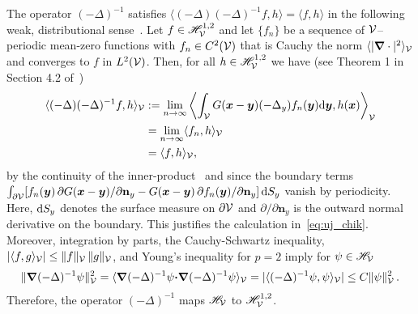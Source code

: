 \documentclass[amsa]{ipart}
\begin{document}
The operator $(-\Delta)^{-1}$ satisfies $\langle(-\Delta)(-\Delta)^{-1}f,h\rangle=\langle f,h\rangle$ in the
following weak, distributional
sense~\cite{McOwen:2003:PDE,Folland:95:PDEs}. Let
$f\in\mathscr{H}^{1,2}_{\mathcal{V}}$ and let $\{ f_n\}$ be a sequence of
$\mathcal{V}$--periodic mean-zero functions with $f_n\in C^2(\mathcal{V})$ that is
Cauchy the norm $\langle|\mbox{\boldmath${\nabla}$}\cdot|^2\rangle_{\mathcal{V}}$ and converges to $f$ in 
$L^2(\mathcal{V})$. Then, for all $h\in\mathscr{H}^{1,2}_{\mathcal{V}}$ we have  (see
Theorem 1 in Section 4.2 of~\cite{McOwen:2003:PDE})      
%
\begin{align}\label{eq:Weak_Delta_1}
  \langle(-\Delta)(-\Delta)^{-1}f,h\rangle_{\Vc}
  &:=\lim_{n\to\infty}
  \left\langle\int_{\Vc} G(\vecx-\vecy)(-\Delta_y)f_n(\vecy)\d\vecy,h(\vecx)\right\rangle_{\Vc}
  \\\notag
  &=\lim_{n\to\infty}\langle f_n,h\rangle_{\Vc}
  \\\notag
  &=\langle f,h\rangle_{\Vc},
  \notag
\end{align}
%
by the continuity of the
inner-product~\cite{Folland:99:RealAnalysis,Stakgold:BVP:2000} 
and since the boundary terms~\cite{McOwen:2003:PDE}
$\int_{\partial\mathcal{V}}[f_n(\boldsymbol{y})\,\partial G(\boldsymbol{x}-\boldsymbol{y})/\partial\mathbf{n}_y
-G(\boldsymbol{x}-\boldsymbol{y})\,\partial f_n(\boldsymbol{y})/\partial\mathbf{n}_y]\,\mathrm{d} S_y$ vanish by   
periodicity. Here, $\mathrm{d} S_y$ denotes the surface measure on $\partial\mathcal{V}$ and
$\partial/\partial\mathbf{n}_y$ is the outward normal derivative on the
boundary. This justifies the calculation
in~\eqref{eq:uj_chik}. Moreover, integration by parts, the
Cauchy-Schwartz inequality, $|\langle f,g\rangle_{\mathcal{V}}|\leq\|f\|_{\mathcal{V}}\,\|g\|_{\mathcal{V}}$, and
Young's inequality for $p=2$ imply for $\psi\in\mathscr{H}_{\mathcal{V}}$ 
%
\begin{align}\label{eq:L2_to_H1}
  \|\bnabla(-\Delta)^{-1}\psi\|^2_{\Vc}=\langle\bnabla(-\Delta)^{-1}\psi\bcdot\bnabla(-\Delta)^{-1}\psi\rangle_{\Vc}
              =|\langle(-\Delta)^{-1}\psi,\psi\rangle_{\Vc}|
              \leq C\|\psi\|_{\Vc}^2\,.
\end{align}
%
Therefore, the operator $(-\Delta)^{-1}$ maps $\mathscr{H}_{\mathcal{V}}$ to
$\mathscr{H}^{1,2}_{\mathcal{V}}$. 
\end{document}
